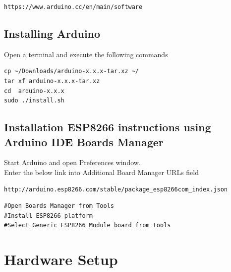 \documentclass[journal,12pt,twocolumn]{IEEEtran}
\begin{document}
\begin{lstlisting}
https://www.arduino.cc/en/main/software
\end{lstlisting}
\subsection{ Installing Arduino}
Open a terminal and execute the following commands
\begin{lstlisting}
cp ~/Downloads/arduino-x.x.x-tar.xz ~/
tar xf arduino-x.x.x-tar.xz
cd  arduino-x.x.x
sudo ./install.sh
\end{lstlisting}

\subsection{Installation ESP8266 instructions using Arduino IDE Boards Manager}
Start Arduino and open Preferences window.\\
Enter the below link into Additional Board Manager URLs field
\begin{lstlisting}
http://arduino.esp8266.com/stable/package_esp8266com_index.json
\end{lstlisting}
\begin{lstlisting}
#Open Boards Manager from Tools
#Install ESP8266 platform
#Select Generic ESP8266 Module board from tools
\end{lstlisting}
\section{Hardware Setup}
\end{document}
